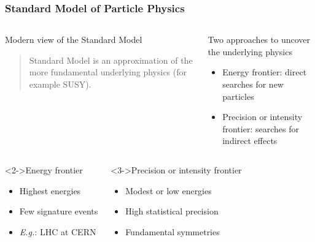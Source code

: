 \begin{frame}[t]
 \frametitle{Standard Model of Particle Physics}
 \begin{columns}
   \begin{block}{Modern view of the Standard Model}
    \begin{quote}
     Standard Model is an approximation of the more fundamental underlying physics (for example SUSY).
    \end{quote}
   \end{block}
   \begin{block}{Two approaches to uncover the underlying physics}
    \begin{itemize}
     \item \alert{Energy frontier}: direct searches for new particles
     \item \alert{Precision} or \alert{intensity frontier}: searches for indirect effects
    \end{itemize}
   \end{block}
 \end{columns}
 \vspace{\baselineskip}
 \begin{columns}[T]
   \begin{block}<2->{Energy frontier}
    \begin{itemize}
     \item Highest energies
     \item Few signature events
     \item \textit{E.g.}: LHC at CERN
    \end{itemize}
   \end{block}
   \begin{block}<3->{Precision or intensity frontier}
    \begin{itemize}
     \item Modest or low energies
     \item High statistical precision
     \item \alert{Fundamental symmetries}
    \end{itemize}
   \end{block}
 \end{columns}
\end{frame}
